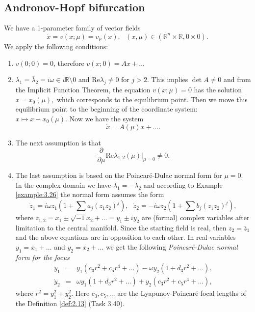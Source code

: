 \subsection{Andronov-Hopf bifurcation}
We have a 1-parameter family of vector fields
$$
\dot{x}=v(x;\mu )=v_{\mu }(x),\text{ \ \ }\left( x,\mu \right) \in \left(
\mathbb{R}^{n}\times \mathbb{R},0\times 0\right) .
$$
We apply the following conditions:
\begin{enumerate}
	\item $v(0;0)=0$, therefore $v(x;0)=Ax+\ldots $
	\item $\lambda _{1}=\bar{\lambda}_{2}=i\omega \in i\mathbb{R}\setminus 0$
	and $\textrm{Re}\lambda _{j}\not=0$ for $j>2.$ This implies $\det A\not=0$ and from the Implicit Function Theorem, the equation $v(x;\mu )=0$ has the solution $x=x_{0}(\mu ),$ which corresponds to the equilibrium point. Then we move this equilibrium point to the beginning of the coordinate system:
	$x\longmapsto x-x_{0}(\mu ).$ Now we have the system
	$$
	\dot{x}=A(\mu )x+\ldots .
	$$
	\item The next assumption is that
	$$
	\frac{\partial }{\partial \mu }\textrm{Re}\lambda _{1,2}(\mu )|_{\mu =0}\not=0.
	$$	
	\item The last assumption is based on the Poincaré-Dulac normal form for $\mu = 0$. In the complex domain we have $\lambda_{1}=-\lambda _{2}$ and according to Example \ref{example:3.26} the normal form assumes the form
	$$
	\dot{z}_{1}=i\omega z_{1}\left( 1+\sum a_{j}\left( z_{1}z_{2}\right)
	^{j}\right) ,\text{ \ \ }\dot{z}_{2}=-i\omega z_{2}\left( 1+\sum b_{j}\left(
	z_{1}z_{2}\right) ^{j}\right) ,
	$$
	where $z_{1,2}=x_{1}\pm \sqrt{-1}x_{2}+\ldots =y_{1}\pm iy_{2}$ are (formal) complex variables after limitation to the central manifold. Since the starting field is real, then $z_{2}=\bar{z}_{1}$ and the above equations are in opposition to each other. In real variables $y_{1}=x_{1}+\ldots $ and $y_{2}=x_{2}+\ldots $ we get the following \emph{Poincaré-Dulac normal form for the focus}
	\begin{eqnarray*}
		\dot{y}_{1} &=&y_{1}\left( c_{3}r^{2}+c_{5}r^{4}+\ldots \right) -\omega
		y_{2}\left( 1+d_{3}r^{2}+\ldots \right) , \\
		\dot{y}_{2} &=&\omega y_{1}\left( 1+d_{3}r^{2}+\ldots \right) +y_{2}\left(
		c_{3}r^{2}+c_{5}r^{4}+\ldots \right) ,
	\end{eqnarray*}
	where $r^{2}=y_{1}^{2}+y_{2}^{2}.$ Here $c_{3},c_{5},\ldots $ are the Lyapunov-Poincaré focal lengths of the Definition \ref{def:2.13} (Task 3.40).
\end{enumerate}


